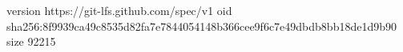 version https://git-lfs.github.com/spec/v1
oid sha256:8f9939ca49c8535d82fa7e7844054148b366cee9f6c7e49dbdb8bb18de1d9b90
size 92215
